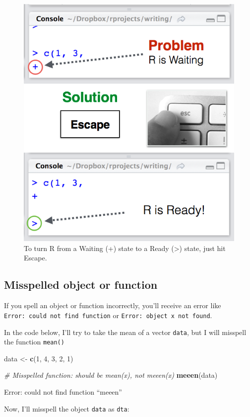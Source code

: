 \documentclass[]{book}
\newenvironment{Shaded}{\begin{snugshade}}{\end{snugshade}}
\newcommand{\KeywordTok}[1]{\textcolor[rgb]{0.13,0.29,0.53}{\textbf{{#1}}}}
\newcommand{\DecValTok}[1]{\textcolor[rgb]{0.00,0.00,0.81}{{#1}}}
\newcommand{\StringTok}[1]{\textcolor[rgb]{0.31,0.60,0.02}{{#1}}}
\newcommand{\CommentTok}[1]{\textcolor[rgb]{0.56,0.35,0.01}{\textit{{#1}}}}
\newcommand{\NormalTok}[1]{{#1}}
\theoremstyle{definition}
\theoremstyle{definition}
\theoremstyle{remark}
\begin{document}
\begin{figure}

{\centering \includegraphics[width=0.5\linewidth]{images/escapesolution} 

}

\caption{To turn R from a Waiting (+) state to a Ready (>) state, just hit Escape.}\label{fig:rstate}
\end{figure}

\subsection{Misspelled object or
function}\label{misspelled-object-or-function}

If you spell an object or function incorrectly, you'll receive an error
like \texttt{Error:\ could\ not\ find\ function} or
\texttt{Error:\ object\ \textquotesingle{}x\textquotesingle{}\ not\ found}.

In the code below, I'll try to take the mean of a vector \texttt{data},
but I will misspell the function \texttt{mean()}

\begin{Shaded}
\begin{Highlighting}[]
\NormalTok{data <-}\StringTok{ }\KeywordTok{c}\NormalTok{(}\DecValTok{1}\NormalTok{, }\DecValTok{4}\NormalTok{, }\DecValTok{3}\NormalTok{, }\DecValTok{2}\NormalTok{, }\DecValTok{1}\NormalTok{)}

\CommentTok{# Misspelled function: should be mean(x), not meeen(x)}
\KeywordTok{meeen}\NormalTok{(data)}
\end{Highlighting}
\end{Shaded}

Error: could not find function ``meeen''

Now, I'll misspell the object \texttt{data} as \texttt{dta}:
\end{document}
